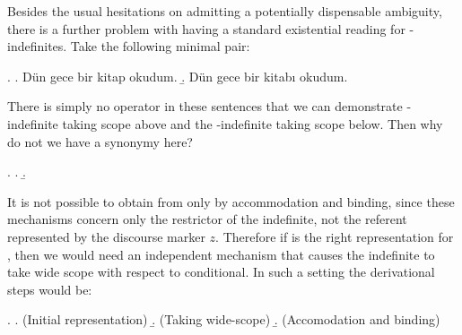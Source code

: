 \documentclass[11pt,a4paper]{article}
\begin{document}
Besides the usual hesitations on admitting a potentially dispensable
ambiguity, there is a further problem with having a standard
existential reading for \acc-indefinites. Take the following minimal
pair:

\ex.
\a. Dün gece bir kitap okudum.
\b. Dün gece bir kitabı okudum.


There is simply no operator in these sentences that we can demonstrate
\acc-indefinite taking scope above and the \zero-indefinite taking
scope below. Then why do not we have a synonymy here? 



\ex.
\a.\label{exdrswide1}%
\vspace{10pt}
\b.\label{exdrswide2}%


It is not possible to obtain  from 
only by accommodation and binding, since these mechanisms concern only
the restrictor of the indefinite, not the referent represented by the
discourse marker $z$. Therefore if  is the right
representation for , then we would need an independent
mechanism that causes the indefinite to take wide scope with respect
to conditional. In such a setting the derivational steps would be:

\ex.
\a.\label{exdrswidedrv1}%
\hfill(Initial representation)\vspace{10pt}
\b.\label{exdrswidedrv2}%
\hfill (Taking wide-scope)\vspace{10pt}
\b.\label{exdrswidedrv2}%
\hfill (Accomodation and binding)
\end{document}
